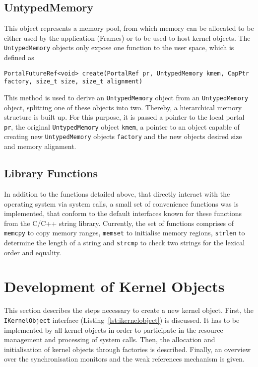 \subsection{UntypedMemory}
This object represents a memory pool, from which memory can be allocated to be
either used by the application (Frames) or to be used to host kernel objects.
The \texttt{UntypedMemory} objects only expose one function to the user space,
which is defined as
\lstset{language=c++,numbers=none}
\begin{lstlisting}
PortalFutureRef<void> create(PortalRef pr, UntypedMemory kmem, CapPtr factory, size_t size, size_t alignment)
\end{lstlisting}
\noindent This method is used to derive an \texttt{UntypedMemory} object from an
\texttt{UntypedMemory} object, splitting one of these objects into two. Thereby,
a hierarchical memory structure is built up. For this purpose, it is passed a
pointer to the local portal \texttt{pr}, the original \texttt{UntypedMemory}
object \texttt{kmem}, a pointer to an object capable of creating new
\texttt{UntypedMemory} objects \texttt{factory} and the new objects desired size
and memory alignment.

\subsection{Library Functions} In addition to the functions detailed above, that
directly interact with the operating system via system calls, a small set of
convenience functions was is implemented, that conform to the default interfaces
known for these functions from the C/C++ string library. Currently, the set of
functions comprises of \texttt{memcpy} to copy memory ranges, \texttt{memset} to
initialise memory regions, \texttt{strlen} to determine the length of a string
and \texttt{strcmp} to check two strings for the lexical order and equality.

\section{Development of Kernel Objects}
\label{sec:kernel-objects}

This section describes the steps necessary to create a new kernel
object. First, the \texttt{IKernelObject} interface
(Listing~\ref{lst:ikernelobject}) is discussed. It has to be
implemented by all kernel objects in order to participate in the
resource management and processing of system calls.  Then, the
allocation and initialisation of kernel objects through factories is
described.  Finally, an overview over the synchronisation monitors and
the weak references mechanism is given.

